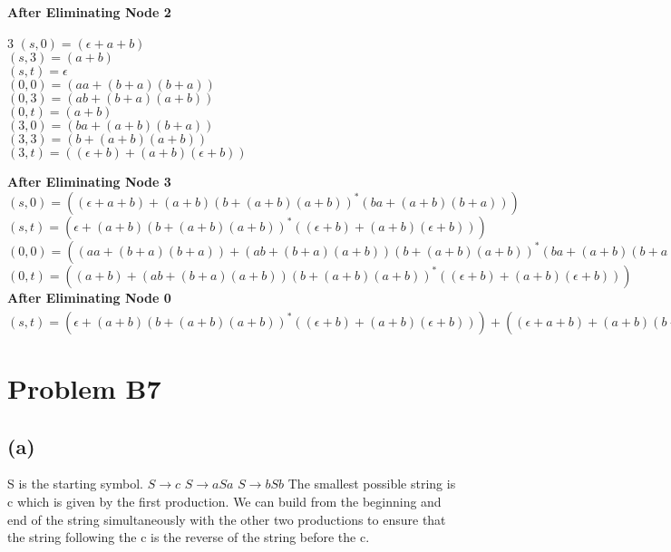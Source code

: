 \documentclass[12pt]{article}
\begin{document}
\noindent\textbf{After Eliminating Node 2}
\begin{multicols}{3}
\noindent
$(s,0) = (\epsilon + a+b)$\\
$(s,3) = (a+b)$\\
$(s,t) = \epsilon$\\
\columnbreak
\break
$(0,0) = (aa+(b+a)(b+a))$\\
$(0,3) = (ab+(b+a)(a+b))$\\
$(0,t) = (a+b)$\\
\columnbreak
\break
$(3,0) = (ba+(a+b)(b+a))$\\
$(3,3) = (b+(a+b)(a+b))$\\
$(3,t) = ((\epsilon+b)+(a+b)(\epsilon + b))$\\
\end{multicols}

\noindent\textbf{After Eliminating Node 3}\\
$(s,0) = ((\epsilon + a+b) + (a+b)(b+(a+b)(a+b))^*(ba+(a+b)(b+a)))$\\
$(s,t) = (\epsilon + (a+b)(b+(a+b)(a+b))^*((\epsilon+b)+(a+b)(\epsilon + b)))$\\
$(0,0) = ((aa+(b+a)(b+a)) + (ab+(b+a)(a+b))(b+(a+b)(a+b))^*(ba+(a+b)(b+a)))$\\
$(0,t) = ((a+b) + (ab+(b+a)(a+b))(b+(a+b)(a+b))^*((\epsilon+b)+(a+b)(\epsilon + b)))$\\

\noindent\textbf{After Eliminating Node 0}\\
$(s,t) = (\epsilon + (a+b)(b+(a+b)(a+b))^*((\epsilon+b)+(a+b)(\epsilon + b))) +
((\epsilon + a+b) + (a+b)(b+(a+b)(a+b))^*(ba+(a+b)(b+a)))
((aa+(b+a)(b+a)) + (ab+(b+a)(a+b))(b+(a+b)(a+b))^*(ba+(a+b)(b+a)))^*
((a+b) + (ab+(b+a)(a+b))(b+(a+b)(a+b))^*((\epsilon+b)+(a+b)(\epsilon + b)))
$\\

\section*{Problem B7}
\subsection*{(a)} S is the starting symbol.
\newline
$S \rightarrow c$ \newline
$S \rightarrow aSa$ \newline
$S \rightarrow bSb$ \newline
The smallest possible string is c which is given by the first production.
We can build from the beginning and end of the string simultaneously with the
other two productions to ensure that the string following the c is the reverse
of the string before the c.
\end{document}
